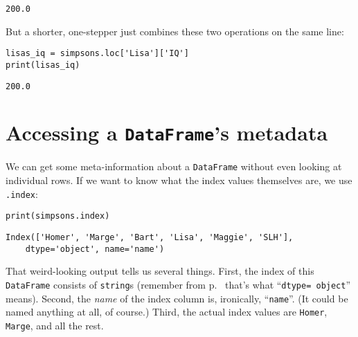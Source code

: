 \begin{Verbatim}[fontsize=\small,samepage=true,frame=leftline,framesep=5mm,framerule=1mm]
200.0
\end{Verbatim}

But a shorter, one-stepper just combines these two operations on the same line:

\begin{Verbatim}[fontsize=\small,samepage=true,frame=single,framesep=3mm]
lisas_iq = simpsons.loc['Lisa']['IQ']
print(lisas_iq)
\end{Verbatim}
\vspace{-.2in}

\begin{Verbatim}[fontsize=\small,samepage=true,frame=leftline,framesep=5mm,framerule=1mm]
200.0
\end{Verbatim}

\section{Accessing a \texttt{DataFrame}'s metadata}


We can get some meta-information about a \texttt{DataFrame} without even
looking at individual rows. If we want to know what the index values themselves
are, we use \texttt{.index}:

\begin{Verbatim}[fontsize=\small,samepage=true,frame=single,framesep=3mm]
print(simpsons.index)
\end{Verbatim}
\vspace{-.2in}

\begin{Verbatim}[fontsize=\small,samepage=true,frame=leftline,framesep=5mm,framerule=1mm]
Index(['Homer', 'Marge', 'Bart', 'Lisa', 'Maggie', 'SLH'],
    dtype='object', name='name')
\end{Verbatim}

That weird-looking output tells us several things. First, the index of this
\texttt{DataFrame} consists of \texttt{string}s (remember from
p.~\pageref{dtypeRules} that's what ``\texttt{dtype=\textquotesingle
object\textquotesingle}'' means). Second,
the \textit{name} of the index column is, ironically, ``\texttt{name}''. (It
could be named anything at all, of course.) Third, the actual index values are
\texttt{Homer}, \texttt{Marge}, and all the rest.


